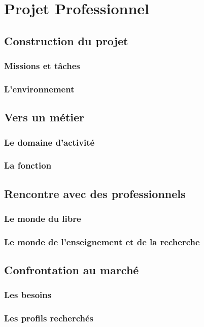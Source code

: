 \documentclass[a4paper,12pt, draft]{report}
\begin{document}
\part{Projet Professionnel}

\chapter{Construction du projet} 
\section{Missions et tâches}
\section{L'environnement}

\chapter{Vers un métier}
\section{Le domaine d'activité}
\section{La fonction}

\chapter{Rencontre avec des professionnels}
\section{Le monde du libre}
\section{Le monde de l'enseignement et de la recherche}

\chapter{Confrontation au marché}
\section{Les besoins}
\section{Les profils recherchés}
\end{document}
